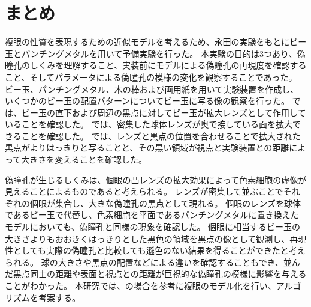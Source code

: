 \section{まとめ}
\label{SEcperimentTotal}

複眼の性質を表現するための近似モデルを考えるため、永田の実験をもとにビー玉とパンチングメタルを用いて予備実験を行った。
本実験の目的は3つあり、偽瞳孔のしくみを理解すること、実装前にモデルによる偽瞳孔の再現度を確認すること、そしてパラメータによる偽瞳孔の模様の変化を観察することであった。
ビー玉、パンチングメタル、木の棒および画用紙を用いて実験装置を作成し、いくつかのビー玉の配置パターンについてビー玉に写る像の観察を行った。
では、ビー玉の直下および周辺の黒点に対してビー玉が拡大レンズとして作用していることを確認した。
では、密集した球体レンズが奥で接している面を拡大できることを確認した。
では、レンズと黒点の位置を合わせることで拡大された黒点がよりはっきりと写ることと、その黒い領域が視点と実験装置との距離によって大きさを変えることを確認した。

偽瞳孔が生じるしくみは、個眼の凸レンズの拡大効果によって色素細胞の虚像が見えることによるものであると考えられる。
レンズが密集して並ぶことでそれぞれの個眼が集合し、大きな偽瞳孔の黒点として現れる。
個眼のレンズを球体であるビー玉で代替し、色素細胞を平面であるパンチングメタルに置き換えたモデルにおいても、偽瞳孔と同様の現象を確認した。
個眼に相当するビー玉の大きさよりもおおきくはっきりとした黒色の領域を黒点の像として観測し、再現性としても実際の偽瞳孔と比較しても遜色のない結果を得ることができたと考えられる。
球の大きさや黒点の配置などによる違いを確認することもでき、並んだ黒点同士の距離や表面と視点との距離が巨視的な偽瞳孔の模様に影響を与えることがわかった。
本研究では、の場合を参考に複眼のモデル化を行い、アルゴリズムを考案する。
